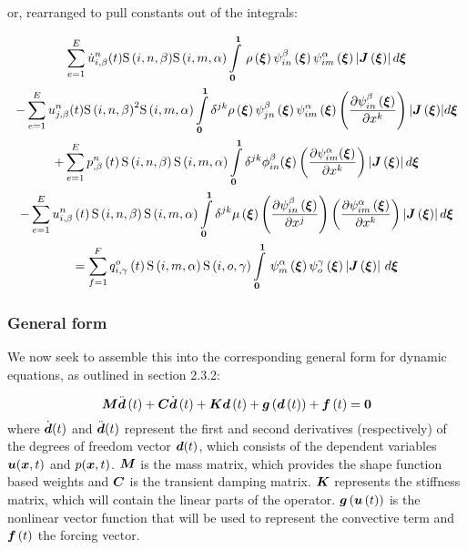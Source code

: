 or, rearranged to pull constants out of the integrals:

\begin{multline}
 \label{NSEFEM4}
  \dsum_{e=1}^{E}{\idxnodedof{\dot{u}}{i}{n}{\beta}}(t){\idxgsf{i}{n}{\beta}}{\idxgsf{i}{m}{\alpha}}
  \gint{\vect{0}}{\vect{1}}{\fnof{\rho}{\vect{\xi}}{\idxgbfn{i}{n}{\beta}{\vect{\xi}}\idxgbfn{i}{m}{\alpha}{\vect{\xi}}
  \abs{\fnof{\matr{J}}{\vect{\xi}}}}}{\vect{\xi}}\\
  -\dsum_{e=1}^{E}{\idxnodedof{u}{j}{n}{\beta}}(t){\idxgsf{i}{n}{\beta}}^2{\idxgsf{i}{m}{\alpha}}
   \dintl{\vect{0}}{\vect{1}}\delta^{jk}{\fnof{\rho}{\vect{\xi}}\idxgbfn{j}{n}{\beta}{\vect{\xi}}
   \idxgbfn{i}{m}{\alpha}{\vect{\xi}}
     \pbrac{\delby{\idxgbfn{i}{n}{\beta}{\vect{\xi}}}{x^{k}}}
  \abs{\fnof{\matr{J}}{\vect{\xi}}}}d{\vect{\xi}}\\
    +\dsum_{e=1}^{E}{\fnof{\idxnodedof{p}{}{n}{\beta}}{t}\idxgsf{i}{n}{\beta}\idxgsf{i}{m}{\alpha}}
    \dintl{\vect{0}}{\vect{1}}\delta^{jk}\phi_{in}^{\beta}({\vect{\xi}})
    \pbrac{\delby{\psi_{im}^{\alpha}({\vect{\xi}})}{x^{k}}}\abs{\fnof{\matr{J}}{\vect{\xi}}}d\vect{\xi}\\
    -\dsum_{e=1}^{E}\fnof{\idxnodedof{u}{i}{n}{\beta}}{t}\idxgsf{i}{n}{\beta}\idxgsf{i}{m}{\alpha}
    \dintl{\vect{0}}{\vect{1}}{\delta^{jk}\fnof{\mu}{\vect{\xi}}}\pbrac{\delby{\idxgbfn{i}{n}{\beta}{\vect{\xi}}}{x^{j}}}
      \pbrac{\delby{\idxgbfn{i}{m}{\alpha}{\vect{\xi}}}{x^{k}}}
      \abs{\fnof{\matr{J}}{\vect{\xi}}}d{\vect{\xi}}\\
  =\dsum_{f=1}^{F}\fnof{\idxnodedof{q}{i}{o}{\gamma}}{t}\idxgsf{i}{m}{\alpha}\idxgsf{i}{o}{\gamma}
   \gint{\vect{0}}{\vect{1}}{\gbfn{m}{\alpha}{\vect{\xi}}\gbfn{o}{\gamma}{\vect{\xi}}
    \abs{\fnof{\matr{J}}{\vect{\xi}}}}{\vect{\xi}}
\end{multline}


\subsubsection{General form}

We now seek to assemble this into the corresponding general form for dynamic equations, as outlined in section 2.3.2:

\begin{equation}
  \matr{M}\fnof{\ddot{\vect{d}}}{t}+\matr{C}\fnof{\dot{\vect{d}}}{t}+\matr{K}\fnof{\vect{d}}{t}+
  \fnof{\vect{g}}{\fnof{\vect{d}}{t}}+\fnof{\vect{f}}{t}=\vect{0}
  \label{eqn:NSEGeneralDynamic}
\end{equation}
where $\dot{\vect{d}}(t)$ and $\ddot{\vect{d}}(t)$ represent the first and second derivatives (respectively) of the degrees of freedom vector $\vect{d}(t)$, which consists of the dependent variables $\vect{u}(\vect{x},t)$ and $p(\vect{x},t)$. $\matr{M}$ is the mass matrix, which provides the shape function based weights and $\matr{C}$ is the transient damping matrix. $\matr{K}$ represents the stiffness matrix, which will contain the linear parts of the operator. $\fnof{\vect{g}}{\fnof{\vect{u}}{t}}$ is the nonlinear vector function that will be used to represent the convective term and $\fnof{\vect{f}}{t}$ the forcing vector.

